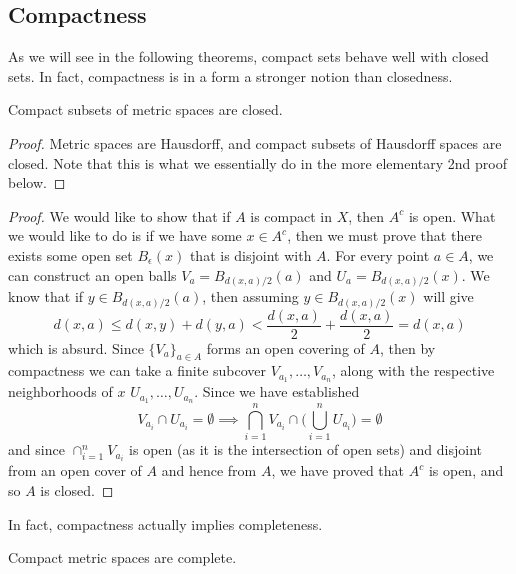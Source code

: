 \subsection{Compactness} 

  As we will see in the following theorems, compact sets behave well with closed sets. In fact, compactness is in a form a stronger notion than closedness. 

  \begin{theorem}
    Compact subsets of metric spaces are closed. 
  \end{theorem}
  \begin{proof}
    Metric spaces are Hausdorff, and compact subsets of Hausdorff spaces are closed. Note that this is what we essentially do in the more elementary 2nd proof below. 
  \end{proof}
  \begin{proof}
    We would like to show that if $A$ is compact in $X$, then $A^c$ is open. What we would like to do is if we have some $x \in A^c$, then we must prove that there exists some open set $B_\epsilon (x)$ that is disjoint with $A$. For every point $a \in A$, we can construct an open balls $V_a = B_{d(x, a)/2} (a)$ and $U_a = B_{d(x, a)/2} (x)$. We know that if $y \in B_{d(x, a)/2}(a)$, then assuming $y \in B_{d(x, a)/2} (x)$ will give
    \begin{equation}
      d(x, a) \leq d(x, y) + d(y, a) < \frac{d(x, a)}{2} + \frac{d(x, a)}{2} = d(x, a)
    \end{equation}
    which is absurd. 
    Since $\{V_a\}_{a \in A}$ forms an open covering of $A$, then by compactness we can take a finite subcover $V_{a_1}, \ldots, V_{a_n}$, along with the respective neighborhoods of $x$ $U_{a_1}, \ldots, U_{a_n}$. Since we have established 
    \begin{equation}
      V_{a_i} \cap U_{a_i} = \emptyset \implies \bigcap_{i=1}^n V_{a_i} \cap \bigg( \bigcup_{i=1}^n U_{a_i} \bigg) = \emptyset
    \end{equation}
    and since $\cap_{i=1}^n V_{a_i}$ is open (as it is the intersection of open sets) and disjoint from an open cover of $A$ and hence from $A$, we have proved that $A^c$ is open, and so $A$ is closed. 
  \end{proof}

  In fact, compactness actually implies completeness. 

  \begin{theorem}
    Compact metric spaces are complete. 
  \end{theorem} 

